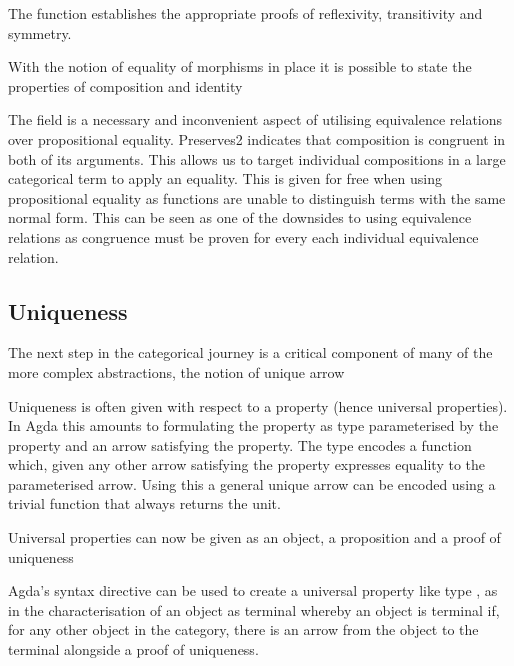 The  function establishes the appropriate proofs of
reflexivity, transitivity and symmetry.

With the notion of equality of morphisms in place it is possible to state the
properties of composition and identity


The field  is a necessary and inconvenient aspect of
utilising equivalence relations over propositional equality. Preserves2
indicates that composition is congruent in both of its arguments. This allows us
to target individual compositions in a large categorical term to apply an
equality. This is given for free when using propositional equality as functions
are unable to distinguish terms with the same normal form. This can be seen as
one of the downsides to using equivalence relations as congruence must be proven
for every each individual equivalence relation.


\subsection{Uniqueness}

The next step in the categorical journey is a critical component of many of the
more complex abstractions, the notion of unique arrow


Uniqueness is often given with respect to a property (hence universal
properties). In Agda this amounts to formulating the property as type
parameterised by the property and an arrow satisfying the property. The type
encodes a function which, given any other arrow satisfying the property
expresses equality to the parameterised arrow. Using this a general unique arrow
can be encoded using a trivial function that always returns the unit.

Universal properties can now be given as an object, a proposition and a proof of
uniqueness


Agda's syntax directive can be used to create a universal property like type
, as in the characterisation of an object as terminal whereby an
object is terminal if, for any other object in the category, there is an arrow
from the object to the terminal alongside a proof of uniqueness.

